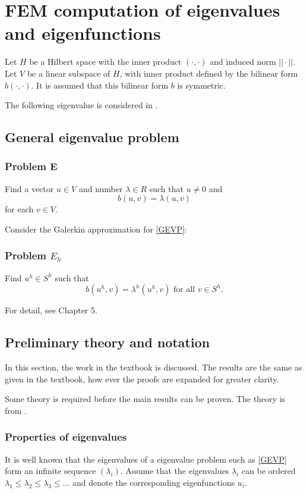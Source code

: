 \documentclass[../../main.tex]{subfiles}
\begin{document}
\section{FEM computation of eigenvalues and eigenfunctions}
Let $H$ be a Hilbert space with the inner product $(\cdot,\cdot)$ and induced norm $||\cdot||$. Let $V$ be a linear subspace of $H$, with inner product defined by the bilinear form $b(\cdot,\cdot)$. It is assumed that this bilinear form $b$ is symmetric.

The following eigenvalue is considered in \cite{SF73}.

\subsection{General eigenvalue problem}
\subsubsection*{Problem E}
Find a vector $u \in V$ and number $\lambda \in R$ such that $u \neq 0$ and
\begin{equation}
	b(u,v) = \lambda (u,v) \label{GEVP}
\end{equation} for each $v \in V$.

Consider the Galerkin approximation for \eqref{GEVP}:
\subsubsection*{Problem $E_h$}
Find $u^h \in S^h$ such that \[b(u^h, v) = \lambda^h(u^h,v) \textrm{ for all } v \in S^h.\] 

For detail, see Chapter 5.

\subsection{Preliminary theory and notation}
In this section, the work in the textbook \cite[p.228-236]{SF73} is discussed. The results are the same as given in the textbook, how ever the proofs are expanded for greater clarity.

Some theory is required before the main results can be proven. The theory is from \cite{SF73}.

\subsubsection*{Properties of eigenvalues}
It is well known that the eigenvalues of a eigenvalue problem such as \eqref{GEVP} form an infinite sequence $(\lambda_i)$. Assume that the eigenvalues $\lambda_i$ can be ordered $\lambda_1 \leq \lambda_2 \leq \lambda_3 \leq ...$ and denote the corresponding eigenfunctions $u_i$.
\end{document}
